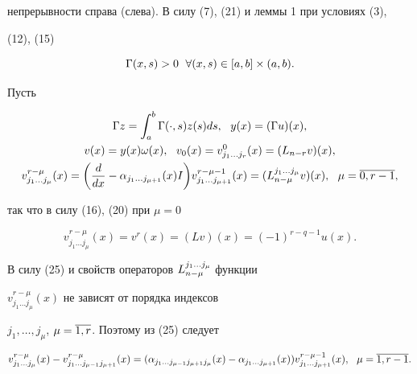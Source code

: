 непрерывности справа (слева). В силу (7), (21) и леммы 1 при условиях (3), 


(12), (15)


\begin{equation}


\Gamma(x,s)>0\ \; \forall(x,s)\in\ab\times(a,b).


\end{equation}





Пусть


\begin{gather}


\Gamma z=\int^b_a \Gamma(\cdot,s)z(s)ds,\ \ y(x)=(\Gamma u)(x), \\


%


v(x)=y(x)\omega(x),\ \ v_0(x)=v^0_{j_1\dotsc j_r}(x)=(L_{n-r}v)(x),\\


%


v^{r-\mu}_{j_1\dotsc j_\mu}(x)=\bigg(\mf{d}{dx}-\a_{j_1\dotsc j_{\mu+1}}


(x)I\bigg)v^{r-\mu-1}_{j_1\dotsc j_{\mu+1}}(x)=


(\l{L}{j_1\dotsc j_\mu}{n-\mu}v)(x),\ \ \mu=\o{0,r-1},


\end{gather}


так что в силу (16), (20) при $\mu=0$


\begin{equation}


v^{r-\mu}_{j_1\dotsc j_\mu}(x)=v^r(x)=(Lv)(x)=(-1)^{r-q-1}u(x).


\end{equation}


В силу (25) и свойств операторов ${L}^{j_1\dotsc j_\mu}_{n-\mu}$ функции


$v^{r-\mu}_{j_1\dotsc j_\mu}(x)$ не зависят от порядка индексов


$j_1,\dotsc,j_\mu$, $\mu=\overline{1,r}$. Поэтому из (25) следует


\begin{equation}


v^{r-\mu}_{j_1\dotsc j_\mu}(x)-v^{r-\mu}_{j_1\dotsc j_{\mu-1}j_{\mu+1}}(x)=


(\a_{j_1\dotsc j_{\mu-1}j_{\mu+1}j_\mu}(x)-


%


\a_{j_1\dotsc j_{\mu+1}}(x))v^{r-\mu-1}_{j_1\dotsc j_{\mu+1}}(x),\ \ 


\mu=\o{1,r-1}.


\end{equation}





